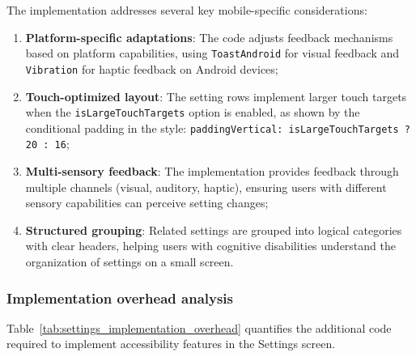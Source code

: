 The implementation addresses several key mobile-specific considerations:

\begin{enumerate}
    \item \textbf{Platform-specific adaptations}: The code adjusts feedback mechanisms based on platform capabilities, using \texttt{ToastAndroid} for visual feedback and \texttt{Vibration} for haptic feedback on Android devices;
    
    \item \textbf{Touch-optimized layout}: The setting rows implement larger touch targets when the \texttt{isLargeTouchTargets} option is enabled, as shown by the conditional padding in the style: \texttt{paddingVertical: isLargeTouchTargets ? 20 : 16};
    
    \item \textbf{Multi-sensory feedback}: The implementation provides feedback through multiple channels (visual, auditory, haptic), ensuring users with different sensory capabilities can perceive setting changes;
    
    \item \textbf{Structured grouping}: Related settings are grouped into logical categories with clear headers, helping users with cognitive disabilities understand the organization of settings on a small screen.
\end{enumerate}

\subsubsection{Implementation overhead analysis}

Table~\ref{tab:settings_implementation_overhead} quantifies the additional code required to implement accessibility features in the Settings screen.


